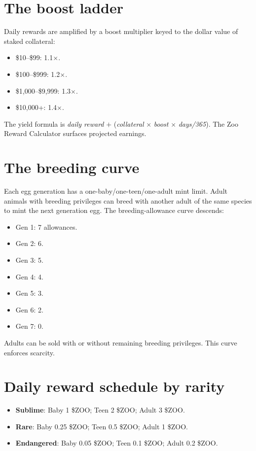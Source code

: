 \documentclass[11pt,letterpaper]{article}
\begin{document}
\section{The boost ladder}

Daily rewards are amplified by a boost multiplier keyed to the dollar value of staked collateral:

\begin{itemize}
  \item \$10--\$99: 1.1$\times$.
  \item \$100--\$999: 1.2$\times$.
  \item \$1{,}000--\$9{,}999: 1.3$\times$.
  \item \$10{,}000+: 1.4$\times$.
\end{itemize}

The yield formula is \emph{daily reward} $+$ (\emph{collateral} $\times$ \emph{boost} $\times$ \emph{days/365}). The Zoo Reward Calculator surfaces projected earnings.

\section{The breeding curve}

Each egg generation has a one-baby/one-teen/one-adult mint limit. Adult animals with breeding privileges can breed with another adult of the same species to mint the next generation egg. The breeding-allowance curve descends:

\begin{itemize}
  \item Gen 1: 7 allowances.
  \item Gen 2: 6.
  \item Gen 3: 5.
  \item Gen 4: 4.
  \item Gen 5: 3.
  \item Gen 6: 2.
  \item Gen 7: 0.
\end{itemize}

Adults can be sold with or without remaining breeding privileges. This curve enforces scarcity.

\section{Daily reward schedule by rarity}

\begin{itemize}
  \item \textbf{Sublime}: Baby 1 \$ZOO; Teen 2 \$ZOO; Adult 3 \$ZOO.
  \item \textbf{Rare}: Baby 0.25 \$ZOO; Teen 0.5 \$ZOO; Adult 1 \$ZOO.
  \item \textbf{Endangered}: Baby 0.05 \$ZOO; Teen 0.1 \$ZOO; Adult 0.2 \$ZOO.
\end{itemize}
\end{document}
